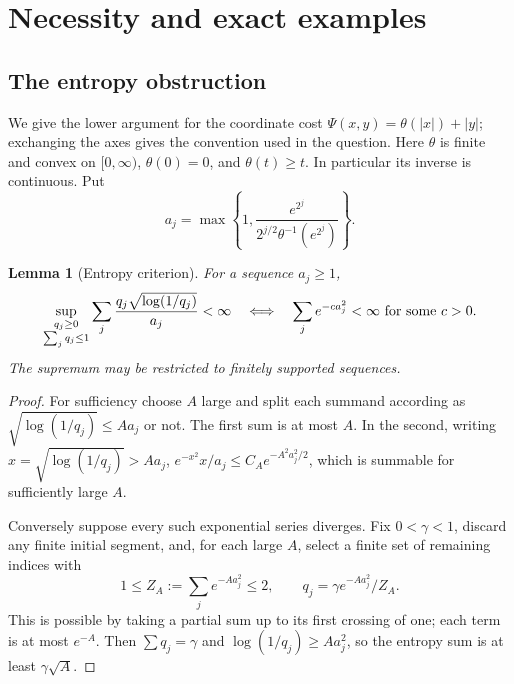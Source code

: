 \documentclass[11pt]{article}
\newtheorem{lemma}[theorem]{Lemma}
\numberwithin{equation}{section}
\begin{document}
\section{Necessity and exact examples}

\subsection{The entropy obstruction}

We give the lower argument for the coordinate cost
\(\Psi(x,y)=\theta(|x|)+|y|\); exchanging the axes gives the convention
used in the question.  Here \(\theta\) is finite and convex on
\([0,\infty)\), \(\theta(0)=0\), and \(\theta(t)\ge t\).  In particular
its inverse is continuous.  Put
\[
 a_j=\max\left\{1,
 \frac{e^{2^j}}{2^{j/2}\theta^{-1}(e^{2^j})}\right\}.
 \tag{L1}\label{lower:eq:aj}
\]

\begin{lemma}[Entropy criterion]\label{lower:lem:entropy}
For a sequence \(a_j\ge1\),
\[
 \sup_{\substack{q_j\ge0\\\sum_jq_j\le1}}
       \sum_j\frac{q_j\sqrt{\log(1/q_j)}}{a_j}<\infty
 \quad\Longleftrightarrow\quad
 \sum_j e^{-c a_j^2}<\infty\ \hbox{for some }c>0.
\]
The supremum may be restricted to finitely supported sequences.
\end{lemma}
\begin{proof}
For sufficiency choose \(A\) large and split each summand according as
\(\sqrt{\log(1/q_j)}\le Aa_j\) or not.  The first sum is at most
\(A\).  In the second, writing \(x=\sqrt{\log(1/q_j)}>Aa_j\),
\(e^{-x^2}x/a_j\le C_Ae^{-A^2a_j^2/2}\), which is summable for
sufficiently large \(A\).

Conversely suppose every such exponential series diverges.  Fix
\(0<\gamma<1\), discard any finite initial segment, and, for each large
\(A\), select a finite set of remaining indices with
\[
 1\le Z_A:=\sum_j e^{-Aa_j^2}\le2,
 \qquad q_j=\gamma e^{-Aa_j^2}/Z_A.
 \tag{L2}\label{lower:eq:gibbs}
\]
This is possible by taking a partial sum up to its first crossing of
one; each term is at most \(e^{-A}\).  Then \(\sum q_j=\gamma\) and
\(\log(1/q_j)\ge Aa_j^2\), so the entropy sum is at least
\(\gamma\sqrt A\).
\end{proof}
\end{document}
